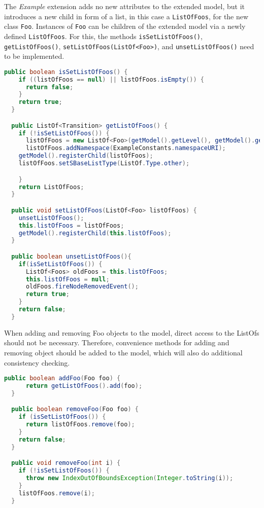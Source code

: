 The \emph{Example} extension adds no new attributes to the extended model,
but it introduces a new child in form of a list, in this case a \texttt{ListOfFoos},
for the new class \texttt{Foo}.
Instances of \texttt{Foo} can be children of the extended model via a newly defined \texttt{ListOfFoos}.
For this, the methods \texttt{isSetListOfFoos()}, \texttt{getListOfFoos()}, \texttt{setListOfFoos(ListOf<Foo>)}, and \texttt{unsetListOfFoos()} need to be implemented.

\begin{lstlisting}[language=Java,caption={ListOf methods and their implementation},label=lst:ModelExtListOfFoos]
public boolean isSetListOfFoos() {
    if ((listOfFoos == null) || listOfFoos.isEmpty()) {
      return false;     
    }   
    return true;
  }

  public ListOf<Transition> getListOfFoos() {
    if (!isSetListOfFoos()) {
      listOfFoos = new ListOf<Foo>(getModel().getLevel(), getModel().getVersion());
      listOfFoos.addNamespace(ExampleConstants.namespaceURI);
    getModel().registerChild(listOfFoos);
    listOfFoos.setSBaseListType(ListOf.Type.other);

    }
    return ListOfFoos;
  }

  public void setListOfFoos(ListOf<Foo> listOfFoos) {
    unsetListOfFoos();
    this.listOfFoos = listOfFoos;
    getModel().registerChild(this.listOfFoos);
  }

  public boolean unsetListOfFoos(){
    if(isSetListOfFoos()) {
      ListOf<Foos> oldFoos = this.listOfFoos;
      this.listOfFoos = null;
      oldFoos.fireNodeRemovedEvent();
      return true;
    }
    return false;
  }
\end{lstlisting}

When adding and removing Foo objects to the model, direct access to the ListOfs should not be necessary.
Therefore, convenience methods for adding and removing object should be added to the model, which will also do additional consistency checking.

\begin{lstlisting}[language=Java,caption={ListOf methods and their implementation},label=lst:ModelExtAddRemoveFoos]
  public boolean addFoo(Foo foo) {
      return getListOfFoos().add(foo);
  }

  public boolean removeFoo(Foo foo) {
    if (isSetListOfFoos()) {
      return listOfFoos.remove(foo);
    }
    return false;
  }

  public void removeFoo(int i) {
    if (!isSetListOfFoos()) {
      throw new IndexOutOfBoundsException(Integer.toString(i));
    }
    listOfFoos.remove(i);
  }
\end{lstlisting}


